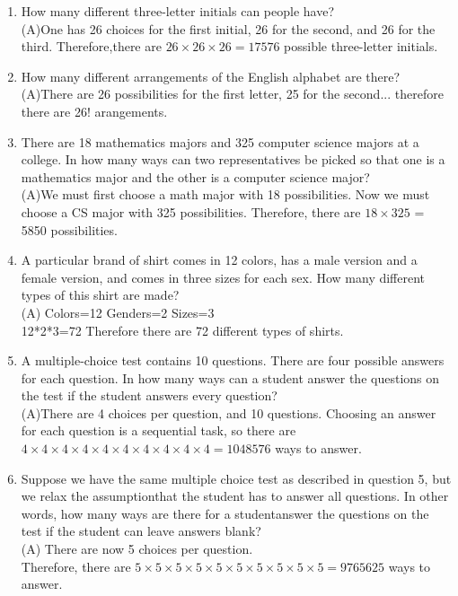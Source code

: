 \documentclass[12pt]{article}
\begin{document}
\begin{enumerate}
\item
How many different three-letter initials can people have?\\
(A)One has 26 choices for the first initial, 26 for the second, and 26 for the third. Therefore,there are $26 \times 26 \times 26=17576$ possible three-letter initials.
\item
How many different arrangements of the English alphabet are there?\\
(A)There are 26 possibilities for the first letter, 25 for the second... therefore there are 26! arangements.
\item
There are 18 mathematics majors and 325 computer science majors at a college. In how many ways can two representatives be picked so that one is a mathematics major and the other is a computer science major?\\
(A)We must first choose a math major with 18 possibilities. Now
we must choose a CS major with 325 possibilities. Therefore, there are $18 \times 325$ = 5850 possibilities.
\item
A particular brand of shirt comes in 12 colors, has a male version and a female version, and comes in three sizes for each sex.  How many different types of this shirt are made?\\
(A)
Colors=12 Genders=2 Sizes=3\\
12*2*3=72 Therefore there are 72 different types of shirts.
\item
A multiple-choice test contains 10 questions.  There are four possible answers for each question.  In how many ways can a student answer the questions on the test if the student answers every question?\\
(A)There are 4 choices per question, and 10 questions. Choosing an answer for each question is a sequential task, so there are $4 \times 4 \times 4 \times 4 \times 4 \times 4 \times 4 \times 4 \times 4 \times 4 = 1048576$ ways
to answer.
\item
Suppose we have the same multiple choice test as described in question 5, but we relax the assumptionthat the student has to answer all questions.  In other words, how many ways are there for a studentanswer the questions on the test if the student can leave answers blank?\\
(A) There are now 5 choices per question.\\
Therefore,
there are $5 \times 5 \times 5 \times 5 \times 5 \times 5 \times 5 \times 5 \times 5 \times 5 = 9765625$ ways to answer.
\end{enumerate}
\end{document}
